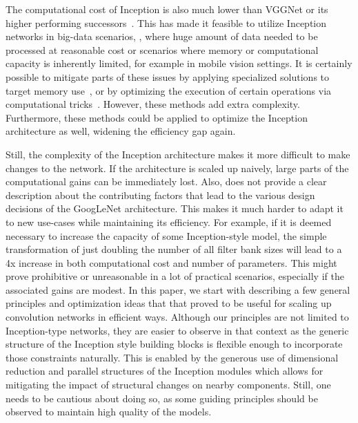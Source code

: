 The computational cost of Inception is also much lower than VGGNet or its
higher performing successors~\cite{he2015delving}. This has made it feasible to
utilize Inception networks in big-data scenarios\cite{schroff2015facenet},
\cite{movshovitz2015ontological}, where huge amount of data needed to be
processed at reasonable cost or scenarios where memory or
computational capacity is inherently limited, for example in mobile vision
settings.
It is certainly possible to mitigate parts of these issues by applying
specialized solutions to target memory use~\cite{chen2015compressing},
\cite{psichogios1993svd}
or by optimizing the execution of certain operations via computational
tricks~\cite{lavin2015fast}. However, these methods add extra complexity.
Furthermore, these methods could be applied to optimize the
Inception architecture
as well, widening the efficiency gap again.

Still, the complexity of the Inception architecture makes
it more difficult to make changes to the network. If the architecture is
scaled up naively, large parts of the computational gains can be immediately
lost. Also, \cite{szegedy2015going} does not provide a clear description
about the contributing factors that lead to the various design decisions
of the GoogLeNet architecture. This makes it much harder to adapt it to new
use-cases while maintaining its efficiency. For example, if it is deemed
necessary to increase the capacity of some Inception-style model, the simple
transformation of just doubling the number of all filter bank sizes
will lead to a 4x increase in both computational cost and
number of parameters. This might prove prohibitive or unreasonable
in a lot of practical scenarios, especially if the associated gains
are modest. In this paper, we start with describing a few general
principles and optimization ideas that that proved to be useful for scaling up
convolution networks in efficient ways. Although our principles
are not limited to Inception-type networks, they are easier to observe
in that context as the generic structure of the Inception style building
blocks is flexible enough to incorporate those constraints naturally.
This is enabled by the generous use of dimensional reduction and
parallel structures of the Inception modules which allows for mitigating
the impact of structural changes on nearby components.
Still, one needs to be cautious about doing so, as some guiding principles
should be observed to maintain high quality of the models.
